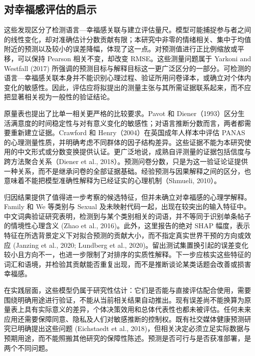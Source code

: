 \documentclass[11pt,letterpaper]{article}
\begin{document}
\subsection{对幸福感评估的启示}\label{ux5bf9ux5e78ux798fux611fux8bc4ux4f30ux7684ux542fux793a}

这些发现区分了检测语言---幸福感关联与建立评估量尺。模型可能捕捉参与者之间的线性变化，却对准确估计分数贡献有限；本研究中非零的情绪相关、集中于均值附近的预测以及较小的误差降幅，体现了这一点。对预测值进行正比例缩放或平移，可以保持 Pearson 相关不变，却改变 RMSE。这些测量问题属于 Yarkoni and Westfall (2017) 所强调的预测目标与解释目标这一更广泛区分的一部分。可检测的语言---幸福感关联本身并不能识别心理过程、验证所用问卷译本，或确立对个体内变化的敏感性。因此，评估应将拟提出的测量主张与其所需证据联系起来，而不应把显著相关视为一般性的验证结论。

原量表也提出了比单一相关更严格的比较要求。Pavot 和 Diener（1993）区分生活满意度的时间稳定性与对有意义变化的敏感性；对语言推断分数而言，两者都需要重新建立证据。Crawford 和 Henry（2004）在英国成年人样本中评估 PANAS 的心理测量性质，并明确考虑不同群体的因子结构差异。这些证据不能为本研究使用的中文形式或分数变换提供认证。更广泛地说，成熟自评测量的证据包括信度与跨方法聚合关系（Diener et al., 2018）。预测问卷分数，只是为这一验证论证提供一种关系，而不是继承问卷的全部证据基础。经验预测与因果解释之间的区分，也意味着不能把模型准确性解释为已经证实的心理机制（Shmueli, 2010）。

归因结果提供了值得进一步考察的候选特征，但并未确立对幸福感的心理学解释。Family 和 We 等类别与 Sexual 及未映射代码一起，出现在较突出的输入特征中。中文词典验证研究表明，检测到与某个类别相关的词语，并不等同于识别单条帖子的情境性心理含义 (Zhao et al., 2016)。此外，这里报告的绝对 SHAP 幅度，表示特征在所选背景定义下对拟合预测的贡献大小，而不指定真实世界干预的方向或效应 (Janzing et al., 2020; Lundberg et al., 2020)。留出测试集置换引起的误差变化较小且方向不一，也进一步限制了对排序的实质性解释。下一步应核实这些特征的词汇和语境，并检验其贡献能否重复出现，而不是推断谈论某类话题会改善或损害幸福感。

在实践层面，这些模型仍属于研究性估计：它们是否能与直接评估配合使用，需要围绕明确用途进行验证，不能从当前相关结果自动推出。现有误差尚不能换算为原量表上具有实际意义的差异，个体决策效用和总体代表性也都未被评估。任何未来应用还需要保障同意、隐私及人们对敏感推断的控制权。既有社交媒体健康预测研究已明确提出这些问题 (Eichstaedt et al., 2018)，但相关决定必须立足实际数据与预期用途，而不能照搬其他研究的保障性陈述。预测是否可行与是否获准部署，是两个不同问题。
\end{document}
